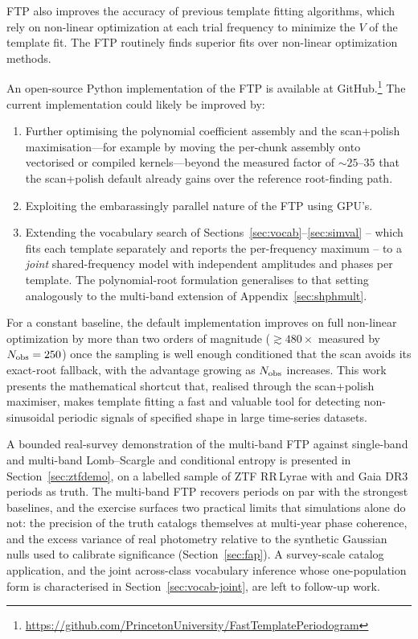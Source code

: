 \documentclass[apj]{emulateapj}
\begin{document}
FTP also improves the accuracy of previous template fitting algorithms,
which rely on non-linear optimization at each trial frequency to minimize
the $V$ of the template fit. The FTP routinely finds superior fits over
non-linear optimization methods.

An open-source Python implementation of the FTP is available at
GitHub.\footnote{\url{https://github.com/PrincetonUniversity/FastTemplatePeriodogram}}
The current implementation could likely be improved by:

\begin{enumerate}
    \item Further optimising the polynomial coefficient assembly and the
          scan+polish maximisation---for example by moving the per-chunk
          assembly onto vectorised or compiled kernels---beyond the measured
          factor of ${\sim}25$--$35$ that the scan+polish default already gains
          over the reference root-finding path.
    \item Exploiting the embarassingly parallel nature of the FTP using GPU's.
    \item Extending the vocabulary search of
          Sections~\ref{sec:vocab}--\ref{sec:simval} -- which fits each
          template separately and reports the per-frequency maximum --
          to a \emph{joint} shared-frequency model with independent
          amplitudes and phases per template.  The polynomial-root
          formulation generalises to that setting analogously to the
          multi-band extension of Appendix~\ref{sec:shphmult}.
\end{enumerate}

For a constant baseline, the default implementation improves on full non-linear optimization by
more than two orders of magnitude ($\gtrsim 480\times$ measured by $N_{\rm obs}=250$) once the sampling
is well enough conditioned that the scan avoids its exact-root fallback, with the advantage growing as
$N_{\rm obs}$ increases. This work presents the mathematical shortcut that, realised through the
scan+polish maximiser, makes template fitting a fast and valuable tool for detecting non-sinusoidal
periodic signals of specified shape in large time-series datasets.

A bounded real-survey demonstration of the multi-band FTP against
single-band and multi-band Lomb--Scargle \citep{Vanderplas+Ivezic_2015}
and conditional entropy \citep{Graham_etal_2013b} is presented in
Section~\ref{sec:ztfdemo}, on a labelled sample of ZTF RR\,Lyrae with
\citet{Chen_etal_2020} and Gaia DR3 \citep{Clementini_etal_2023} periods as
truth.  The multi-band FTP recovers periods on par with the strongest
baselines, and the exercise surfaces two practical limits that simulations
alone do not: the precision of the truth catalogs themselves at multi-year
phase coherence, and the excess variance of real photometry relative to the
synthetic Gaussian nulls used to calibrate significance
(Section~\ref{sec:fap}).  A survey-scale catalog application, and the joint
across-class vocabulary inference whose one-population form is characterised in
Section~\ref{sec:vocab-joint}, are left to follow-up work.
\end{document}
